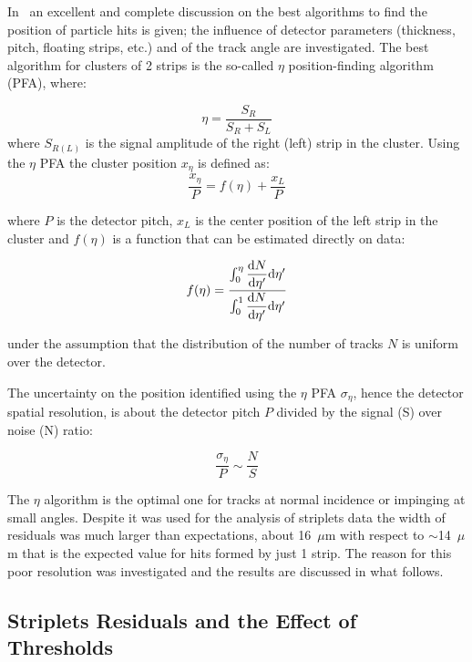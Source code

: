 In~\cite{TURCHETTA} an excellent and complete discussion on the best algorithms to find 
the position of particle hits is given; the influence of detector parameters (thickness, pitch, 
floating strips, etc.) and of the track angle are investigated.
The best algorithm for clusters of 2 strips is the so-called $\eta$ position-finding algorithm (PFA), 
where:

\begin{equation}
\eta=\dfrac{S_R}{S_R+S_L}
\label{eq:eta}
\end{equation} 
where $S_{R(L)}$ is the signal amplitude of the right (left) strip in the cluster.
Using the $\eta$  PFA the cluster position $x_{\eta}$ is defined as:
 \begin{equation}
\dfrac{x_{\eta}}{P}=f(\eta)+\dfrac{x_L}{P}
\label{eq:xeta}
\end{equation} 

where $P$ is the detector pitch, $x_L$ is the center position of the left strip in the cluster and 
$f(\eta)$ is a function that can be estimated directly on data:

\begin{equation}
f(\eta)=\dfrac{\int_0^\eta \dfrac{{\rm d}N}{{\rm d}\eta'}{\rm d}\eta'}{\int_0^1 \dfrac{{\rm d}N}{{\rm d}\eta'}{\rm d}\eta'}
\end{equation}

under the assumption that the distribution of the number of tracks $N$ is uniform over the  
detector.

The uncertainty  on the position identified using the  $\eta$ PFA $\sigma_{\eta}$, hence the detector spatial 
resolution, is about the detector pitch $P$ 
divided by the signal (S) over noise (N) ratio:

\begin{equation}
\dfrac{\sigma_{\eta}}{P}\sim\dfrac{N}{S}
\label{eq:etanoise}
\end{equation}

The $\eta$ algorithm is the optimal one for tracks at normal incidence or impinging at small angles. 
Despite it was used for the analysis of striplets data the width of residuals was much 
larger than expectations, about 16~$\mu$m with respect to $\sim$14~$\mu$m that is the 
expected value  for hits formed by just 1 strip. The reason for this poor resolution 
was investigated and the results are discussed in what follows.

\subsection{Striplets Residuals and the Effect of Thresholds}

